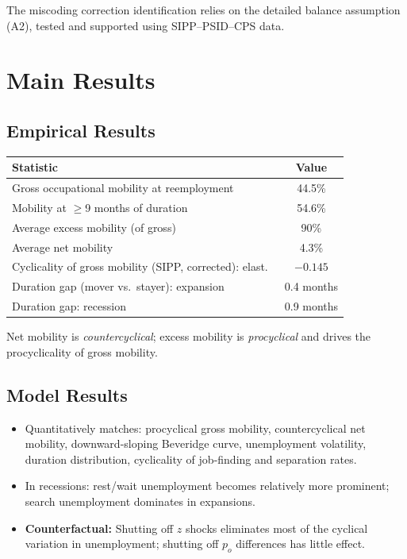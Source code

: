 The miscoding correction identification relies on the detailed balance
assumption (A2), tested and supported using SIPP--PSID--CPS data.

\section{Main Results}

\subsection*{Empirical Results}

\begin{center}
\small
\begin{tabular}{lc}
\toprule
\textbf{Statistic} & \textbf{Value} \\
\midrule
Gross occupational mobility at reemployment & 44.5\% \\
Mobility at $\geq$9 months of duration & 54.6\% \\
Average excess mobility (of gross) & 90\% \\
Average net mobility & 4.3\% \\
Cyclicality of gross mobility (SIPP, corrected): elast.\ & $-0.145$ \\
Duration gap (mover vs.\ stayer): expansion & 0.4 months \\
Duration gap: recession & 0.9 months \\
\bottomrule
\end{tabular}
\end{center}

Net mobility is \emph{countercyclical}; excess mobility is \emph{procyclical}
and drives the procyclicality of gross mobility.

\subsection*{Model Results}

\begin{itemize}
  \item Quantitatively matches: procyclical gross mobility, countercyclical
    net mobility, downward-sloping Beveridge curve, unemployment volatility,
    duration distribution, cyclicality of job-finding and separation rates.
  \item In recessions: rest/wait unemployment becomes relatively more
    prominent; search unemployment dominates in expansions.
  \item \textbf{Counterfactual:} Shutting off $z$ shocks eliminates most of
    the cyclical variation in unemployment; shutting off $p_o$ differences
    has little effect.
\end{itemize}


